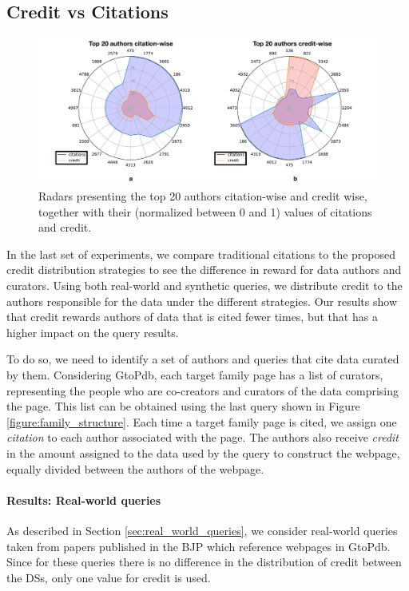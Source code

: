 
\subsection{Credit vs Citations}

\begin{figure}[]
\centering
  \includegraphics[width=1\textwidth]{figures/2_radars}
  \caption{Radars presenting the top 20 authors citation-wise and credit wise, together with their (normalized between 0 and 1) values of citations and credit.}
  \label{figure:2_radars}
\end{figure}

In the last set of experiments, we compare traditional citations to the proposed credit distribution strategies to see the difference in reward for data authors and curators.  
\textcolor{correction}{Using both real-world and synthetic queries, we distribute credit to the authors responsible for the data under the different strategies. Our results show that credit rewards authors of data that is cited fewer times, but that has a higher impact on the query results.} 

\textcolor{correction}{To do so, we need to identify a set of authors and queries that cite data curated by them.}  
Considering GtoPdb, each target family page has a list of curators, representing the people who are co-creators and curators of the data comprising the page. This list can be obtained using the last query shown in Figure \ref{figure:family_structure}. 
Each time a target family page is cited, we assign one {\em citation} to each author associated with the page.  The authors also receive {\em credit} in the amount assigned to the data used by the query to construct the webpage, equally divided between the authors of the webpage.


\paragraph{Results: Real-world queries}
As described in Section \ref{sec:real_world_queries}, we consider real-world queries taken from papers published in the BJP which reference webpages in GtoPdb.
Since for these queries there is no difference in the distribution of credit between the DSs, only one value for credit is used.

